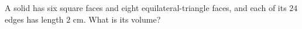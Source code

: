 A solid has six square faces and eight equilateral-triangle faces, and each of its $24$ edges has length $2$ cm. What is its volume?

